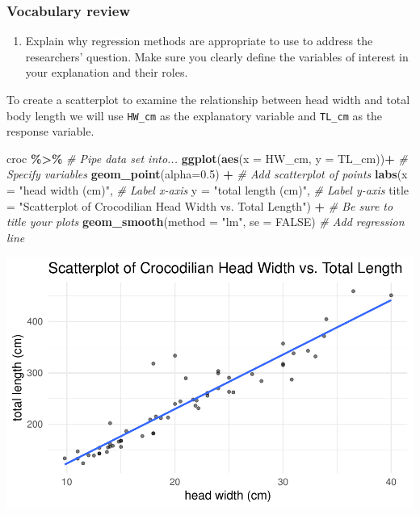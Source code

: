 \documentclass[
]{report}
\newenvironment{Shaded}{\begin{snugshade}}{\end{snugshade}}
\newcommand{\AttributeTok}[1]{\textcolor[rgb]{0.13,0.29,0.53}{#1}}
\newcommand{\CommentTok}[1]{\textcolor[rgb]{0.56,0.35,0.01}{\textit{#1}}}
\newcommand{\ConstantTok}[1]{\textcolor[rgb]{0.56,0.35,0.01}{#1}}
\newcommand{\FloatTok}[1]{\textcolor[rgb]{0.00,0.00,0.81}{#1}}
\newcommand{\FunctionTok}[1]{\textcolor[rgb]{0.13,0.29,0.53}{\textbf{#1}}}
\newcommand{\NormalTok}[1]{#1}
\newcommand{\SpecialCharTok}[1]{\textcolor[rgb]{0.81,0.36,0.00}{\textbf{#1}}}
\newcommand{\StringTok}[1]{\textcolor[rgb]{0.31,0.60,0.02}{#1}}
\providecommand{\tightlist}{%
  \setlength{\itemsep}{0pt}\setlength{\parskip}{0pt}}
\begin{document}
\hypertarget{vocabulary-review-2}{%
\subsubsection*{Vocabulary review}\label{vocabulary-review-2}}

\begin{enumerate}
\def\labelenumi{\arabic{enumi}.}
\tightlist
\item
  Explain why regression methods are appropriate to use to address the researchers' question. Make sure you clearly define the variables of interest in your explanation and their roles.
\end{enumerate}

\vspace{.5in}

\newpage

To create a scatterplot to examine the relationship between head width and total body length we will use \texttt{HW\_cm} as the explanatory variable and \texttt{TL\_cm} as the response variable.

\begin{Shaded}
\begin{Highlighting}[]
\NormalTok{croc }\SpecialCharTok{\%\textgreater{}\%} \CommentTok{\# Pipe data set into...}
\FunctionTok{ggplot}\NormalTok{(}\FunctionTok{aes}\NormalTok{(}\AttributeTok{x =}\NormalTok{ HW\_cm, }\AttributeTok{y =}\NormalTok{ TL\_cm))}\SpecialCharTok{+}  \CommentTok{\# Specify variables}
  \FunctionTok{geom\_point}\NormalTok{(}\AttributeTok{alpha=}\FloatTok{0.5}\NormalTok{) }\SpecialCharTok{+}  \CommentTok{\# Add scatterplot of points}
  \FunctionTok{labs}\NormalTok{(}\AttributeTok{x =} \StringTok{"head width (cm)"}\NormalTok{,  }\CommentTok{\# Label x{-}axis}
       \AttributeTok{y =} \StringTok{"total length (cm)"}\NormalTok{,  }\CommentTok{\# Label y{-}axis}
       \AttributeTok{title =} \StringTok{"Scatterplot of Crocodilian Head Width vs. Total Length"}\NormalTok{) }\SpecialCharTok{+} 
    \CommentTok{\# Be sure to title your plots}
  \FunctionTok{geom\_smooth}\NormalTok{(}\AttributeTok{method =} \StringTok{"lm"}\NormalTok{, }\AttributeTok{se =} \ConstantTok{FALSE}\NormalTok{)  }\CommentTok{\# Add regression line}
\end{Highlighting}
\end{Shaded}

\begin{center}\includegraphics[width=0.7\linewidth]{13-OCA10-regression-simulation_files/figure-latex/unnamed-chunk-2-1} \end{center}
\end{document}
